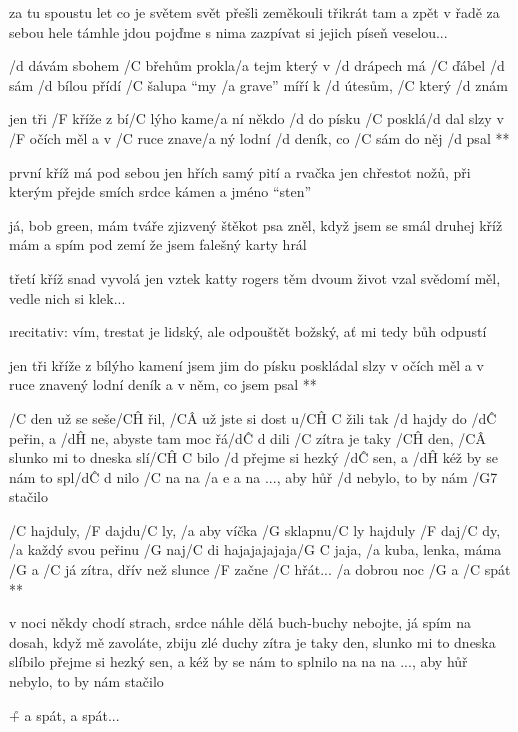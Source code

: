 za tu spoustu let co je světem svět
přešli zeměkouli třikrát tam a zpět
v řadě za sebou hele támhle jdou
pojďme s nima zazpívat si jejich píseň veselou...




/d dávám sbohem /C břehům prokla/a tejm
který v /d drápech má /C ďábel /d sám
/d bílou přídí /C šalupa ``my /a grave''
míří k /d útesům, /C který /d znám

\R jen tři /F kříže z bí/C lýho kame/a ní
   někdo /d do písku /C posklá/d dal
   slzy v /F očích měl a v /C ruce znave/a ný
   lodní /d deník, co /C sám do něj /d psal **

první kříž má pod sebou jen hřích
samý pití a rvačka jen
chřestot nožů, při kterým přejde smích
srdce kámen a jméno ``sten'' \s

já, bob green, mám tváře zjizvený
štěkot psa zněl, když jsem se smál
druhej kříž mám a spím pod zemí
že jsem falešný karty hrál \s

třetí kříž snad vyvolá jen vztek
katty rogers těm dvoum život vzal
svědomí měl, vedle nich si klek... \s

{\i recitativ:
  vím, trestat je lidský, ale odpouštět
     božský, ať mi tedy bůh odpustí}

\R jen tři kříže z bílýho kamení
   jsem jim do písku poskládal
   slzy v očích měl a v ruce znavený
   lodní deník a v něm, co jsem psal **




/C den už se seše/C\^H řil, /C\^A už jste si dost u/{C\^H C} žili
tak /d hajdy do /d\^C peřin, a /d\^H ne, abyste tam moc řá/{d\^C d} dili
/C zítra je taky /C\^H den, /C\^A slunko mi to dneska slí/{C\^H C} bilo
/d přejme si hezký /d\^C sen, a /d\^H kéž by se nám to spl/{d\^C d} nilo
/C na na /{a e a} na ..., aby hůř /d nebylo, to by nám /G7 stačilo

\R  /C hajduly, /F dajdu/C ly, /a aby víčka /G sklapnu/C ly
    hajduly /F daj/C dy, /a každý svou peřinu /G naj/C di
    hajajajajaja/{G C} jaja, /a kuba, lenka, máma /G a /C já
    zítra, dřív než slunce /F začne /C hřát...
    /a dobrou noc /G a /C spát **

v noci někdy chodí strach, srdce náhle dělá buch-buchy
nebojte, já spím na dosah, když mě zavoláte, zbiju zlé duchy
zítra je taky den, slunko mi to dneska slíbilo
přejme si hezký sen, a kéž by se nám to splnilo
na na na ..., aby hůř nebylo, to by nám stačilo

\r + a spát, a spát...



\bye
